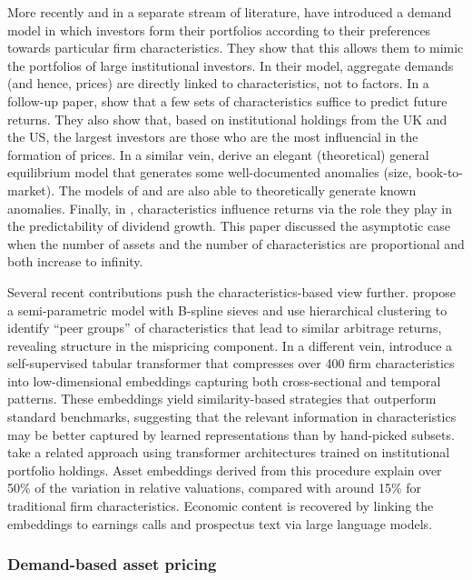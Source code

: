 More recently and in a separate stream of literature, \cite{koijen2019investors} have introduced a demand model in which investors form their portfolios according to their preferences towards particular firm characteristics. They show that this allows them to mimic the portfolios of large institutional investors. In their model, aggregate demands (and hence, prices) are directly linked to characteristics, not to factors. In a follow-up paper, \cite{koijen2019investors} show that a few sets of characteristics suffice to predict future returns. They also show that, based on institutional holdings from the UK and the US, the largest investors are those who are the most influencial in the formation of prices. In a similar vein, \cite{betermier2019supply} derive an elegant (theoretical) general equilibrium model that generates some well-documented anomalies (size, book-to-market). The models of \cite{arnott2014can} and \cite{alti2019dynamic} are also able to theoretically generate known anomalies. Finally, in \cite{martin2019bayesian}, characteristics influence returns via the role they play in the predictability of dividend growth. This paper discussed the asymptotic case when the number of assets and the number of characteristics are proportional and both increase to infinity.

Several recent contributions push the characteristics-based view further. \cite{ge2021dynamic} propose a semi-parametric model with B-spline sieves and use hierarchical clustering to identify ``peer groups'' of characteristics that lead to similar arbitrage returns, revealing structure in the mispricing component. In a different vein, \cite{cartea2025learning} introduce a self-supervised tabular transformer that compresses over 400 firm characteristics into low-dimensional embeddings capturing both cross-sectional and temporal patterns. These embeddings yield similarity-based strategies that outperform standard benchmarks, suggesting that the relevant information in characteristics may be better captured by learned representations than by hand-picked subsets. \cite{gabaix2025asset} take a related approach using transformer architectures trained on institutional portfolio holdings. Asset embeddings derived from this procedure explain over 50\% of the variation in relative valuations, compared with around 15\% for traditional firm characteristics. Economic content is recovered by linking the embeddings to earnings calls and prospectus text via large language models.

\subsubsection{Demand-based asset pricing}

